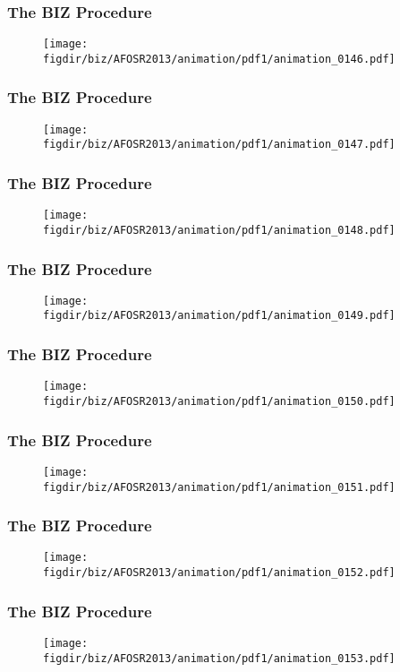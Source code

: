 \documentclass[13pt]{beamer}
\newcommand{\figdir}{../../fig}
\begin{document}
\begin{frame}\frametitle{The BIZ Procedure}\begin{figure}\texttt{[image: \\figdir/biz/AFOSR2013/animation/pdf1/animation\_0146.pdf]}\end{figure}\end{frame}
\begin{frame}\frametitle{The BIZ Procedure}\begin{figure}\texttt{[image: \\figdir/biz/AFOSR2013/animation/pdf1/animation\_0147.pdf]}\end{figure}\end{frame}
\begin{frame}\frametitle{The BIZ Procedure}\begin{figure}\texttt{[image: \\figdir/biz/AFOSR2013/animation/pdf1/animation\_0148.pdf]}\end{figure}\end{frame}
\begin{frame}\frametitle{The BIZ Procedure}\begin{figure}\texttt{[image: \\figdir/biz/AFOSR2013/animation/pdf1/animation\_0149.pdf]}\end{figure}\end{frame}
\begin{frame}\frametitle{The BIZ Procedure}\begin{figure}\texttt{[image: \\figdir/biz/AFOSR2013/animation/pdf1/animation\_0150.pdf]}\end{figure}\end{frame}
\begin{frame}\frametitle{The BIZ Procedure}\begin{figure}\texttt{[image: \\figdir/biz/AFOSR2013/animation/pdf1/animation\_0151.pdf]}\end{figure}\end{frame}
\begin{frame}\frametitle{The BIZ Procedure}\begin{figure}\texttt{[image: \\figdir/biz/AFOSR2013/animation/pdf1/animation\_0152.pdf]}\end{figure}\end{frame}
\begin{frame}\frametitle{The BIZ Procedure}\begin{figure}\texttt{[image: \\figdir/biz/AFOSR2013/animation/pdf1/animation\_0153.pdf]}\end{figure}\end{frame}
\end{document}
